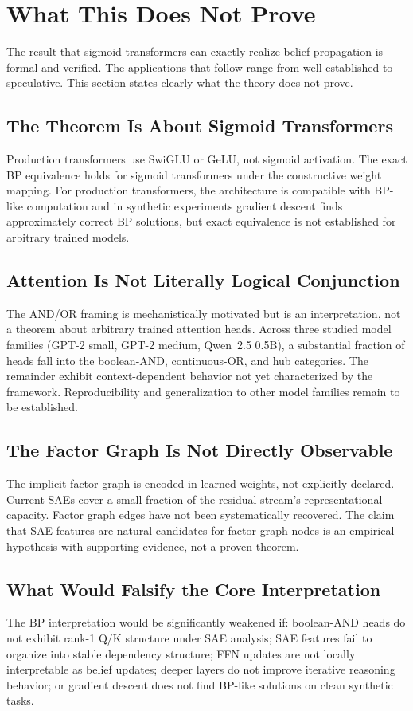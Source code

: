 \section{What This Does Not Prove}
\label{sec:limitations}

The result that sigmoid transformers can exactly realize belief propagation
is formal and verified. The applications that follow range from
well-established to speculative. This section states clearly what the
theory does not prove.

\subsection*{The Theorem Is About Sigmoid Transformers}

Production transformers use SwiGLU or GeLU, not sigmoid activation. The
exact BP equivalence holds for sigmoid transformers under the constructive
weight mapping. For production transformers, the architecture is compatible
with BP-like computation and in synthetic experiments gradient descent
finds approximately correct BP solutions, but exact equivalence is not
established for arbitrary trained models.

\subsection*{Attention Is Not Literally Logical Conjunction}

The AND/OR framing is mechanistically motivated but is an interpretation,
not a theorem about arbitrary trained attention heads. Across three studied
model families (GPT-2 small, GPT-2 medium, Qwen~2.5 0.5B), a substantial
fraction of heads fall into the boolean-AND, continuous-OR, and hub
categories. The remainder exhibit context-dependent behavior not yet
characterized by the framework. Reproducibility and generalization to other
model families remain to be established.

\subsection*{The Factor Graph Is Not Directly Observable}

The implicit factor graph is encoded in learned weights, not explicitly
declared. Current SAEs cover a small fraction of the residual stream's
representational capacity. Factor graph edges have not been systematically
recovered. The claim that SAE features are natural candidates for factor
graph nodes is an empirical hypothesis with supporting evidence, not a
proven theorem.

\subsection*{What Would Falsify the Core Interpretation}

The BP interpretation would be significantly weakened if: boolean-AND heads
do not exhibit rank-1 Q/K structure under SAE analysis; SAE features fail
to organize into stable dependency structure; FFN updates are not locally
interpretable as belief updates; deeper layers do not improve iterative
reasoning behavior; or gradient descent does not find BP-like solutions on
clean synthetic tasks.
